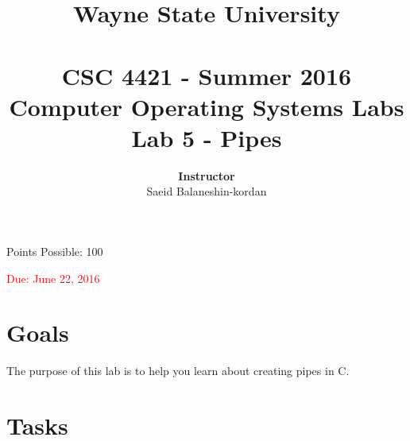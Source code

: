 \documentclass[16pt]{article}
\begin{document}
\title{\huge \textbf{Wayne State University \\
 \vline \\
\Huge CSC 4421 - Summer 2016 \\
 Computer Operating Systems Labs\\
 Lab 5 - Pipes}\\
 \vline
 }
\author{\textbf{Instructor}  \vspace{0.2cm} \\ Saeid Balaneshin-kordan\\
}
\maketitle

\begin{center}
\Large Points Possible: 100

\textcolor{red}{Due: June 22, 2016}
\end{center}

\section*{Goals}

The purpose of this lab is to help you learn about creating pipes in C.

\section*{Tasks}
\end{document}
